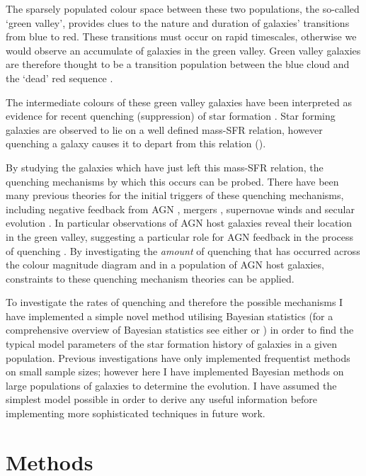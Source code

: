 \documentclass[useAMS,usenatbib]{mn2e}
\begin{document}
The sparsely populated colour space between these two populations, the so-called `green valley', provides clues to the nature and duration of galaxies' transitions from blue to red. These transitions must occur on rapid timescales, otherwise we would observe an accumulate of galaxies in the green valley. Green valley galaxies are therefore thought to be a transition population between the blue cloud and the `dead' red sequence \citep{Martin07, Faber07, Mendez11, Gonc12}. 

The intermediate colours of these green valley galaxies have been interpreted as evidence for recent quenching (suppression) of star formation \citep{Salim07}. Star forming galaxies are observed to lie on a well defined mass-SFR relation, however quenching a galaxy causes it to depart from this relation (\citealt{Noeske07, Peng}).

By studying the galaxies which  have just left this mass-SFR relation, the quenching mechanisms by which this occurs can be probed. There have been many previous theories for the initial triggers of these quenching mechanisms, including negative feedback from AGN \citep{Sch07}, mergers \citep{Darg10a}, supernovae winds \citep{MFB12} and secular evolution \citep{Masters10, Masters11}. In particular observations of AGN host galaxies reveal their location in the green valley, suggesting a particular role for AGN feedback in the process of quenching \citep{Nandra07, Hasinger08, Silverman08, Sch2014}. By investigating the \emph{amount} of quenching that has occurred across the colour magnitude diagram and in a population of AGN host galaxies, constraints to these quenching mechanism theories can be applied. 

To investigate the rates of quenching and therefore the possible mechanisms I have implemented a simple novel method utilising Bayesian statistics (for a comprehensive overview of Bayesian statistics see either \citealt{MacKay} or \citealt{Sivia}) in order to find the typical model parameters of the star formation history of galaxies in a given population. Previous investigations have only implemented frequentist methods on small sample sizes; however here I have implemented Bayesian methods on large populations of galaxies to determine the evolution. I have assumed the simplest model possible in order to derive any useful information before implementing more sophisticated techniques in future work. 


\section{Methods}
\end{document}
